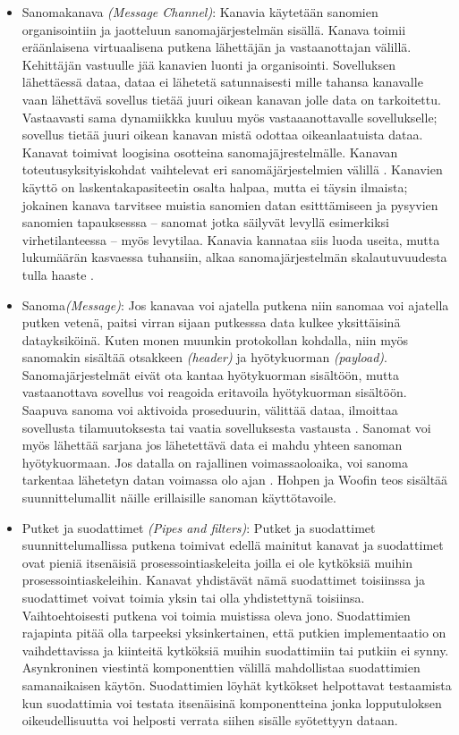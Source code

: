\begin{itemize}
   \item Sanomakanava \textit{(Message Channel)}:
      Kanavia käytetään sanomien organisointiin ja jaotteluun sanomajärjestelmän sisällä. Kanava toimii eräänlaisena virtuaalisena putkena lähettäjän ja vastaanottajan välillä. Kehittäjän vastuulle jää kanavien luonti ja organisointi. Sovelluksen lähettäessä dataa, dataa ei lähetetä satunnaisesti mille tahansa kanavalle vaan lähettävä sovellus tietää juuri oikean kanavan jolle data on tarkoitettu. Vastaavasti sama dynamiikkka kuuluu myös vastaaanottavalle sovellukselle; sovellus tietää juuri oikean kanavan mistä odottaa oikeanlaatuista dataa.
      Kanavat toimivat loogisina osotteina sanomajäjrestelmälle. Kanavan toteutusyksityiskohdat vaihtelevat eri sanomäjärjestelmien välillä \citep{EnterpriseIntegration} \citep{Hohpe2004}.
      Kanavien käyttö on laskentakapasiteetin osalta halpaa, mutta ei täysin ilmaista; jokainen kanava tarvitsee muistia sanomien datan esitttämiseen ja pysyvien sanomien tapauksesssa -- sanomat jotka säilyvät levyllä esimerkiksi virhetilanteessa -- myös levytilaa. Kanavia kannataa siis luoda useita, mutta lukumäärän kasvaessa tuhansiin, alkaa sanomajärjestelmän skalautuvuudesta tulla haaste \citep{Hohpe2004}.
   \item Sanoma\textit{(Message)}:
      Jos kanavaa voi ajatella putkena niin sanomaa voi ajatella putken vetenä, paitsi virran sijaan putkesssa data kulkee yksittäisinä datayksiköinä. Kuten monen muunkin protokollan kohdalla, niin myös sanomakin sisältää otsakkeen \textit{(header)} ja  hyötykuorman \textit{(payload)}. Sanomajärjestelmät eivät ota kantaa hyötykuorman sisältöön, mutta vastaanottava sovellus voi reagoida eritavoila hyötykuorman sisältöön. Saapuva sanoma voi aktivoida proseduurin, välittää dataa, ilmoittaa sovellusta tilamuutoksesta tai vaatia sovelluksesta vastausta \citep{Hohpe2004}. Sanomat voi myös lähettää sarjana jos lähetettävä data ei mahdu yhteen sanoman hyötykuormaan. Jos datalla on rajallinen voimassaoloaika, voi sanoma tarkentaa lähetetyn datan voimassa olo ajan \citep{Hohpe2004}. Hohpen ja Woofin teos sisältää suunnittelumallit näille erillaisille sanoman käyttötavoile.

   \newpage
   \item Putket ja suodattimet \textit{(Pipes and filters)}:
      Putket ja suodattimet suunnittelumallissa putkena toimivat edellä mainitut kanavat ja suodattimet ovat pieniä itsenäisiä prosessointiaskeleita joilla ei ole kytköksiä muihin prosessointiaskeleihin. Kanavat yhdistävät nämä suodattimet toisiinssa ja suodattimet voivat toimia yksin tai olla yhdistettynä toisiinsa. Vaihtoehtoisesti putkena voi toimia muistissa oleva jono. Suodattimien rajapinta pitää olla tarpeeksi yksinkertainen, että putkien implementaatio on vaihdettavissa ja kiinteitä kytköksiä muihin suodattimiin tai putkiin ei synny.
      Asynkroninen viestintä komponenttien välillä mahdollistaa suodattimien samanaikaisen käytön.
   Suodattimien löyhät kytkökset helpottavat testaamista kun suodattimia voi testata itsenäisinä komponentteina jonka lopputuloksen oikeudellisuutta voi helposti verrata siihen sisälle syötettyyn dataan.



\end{itemize}
